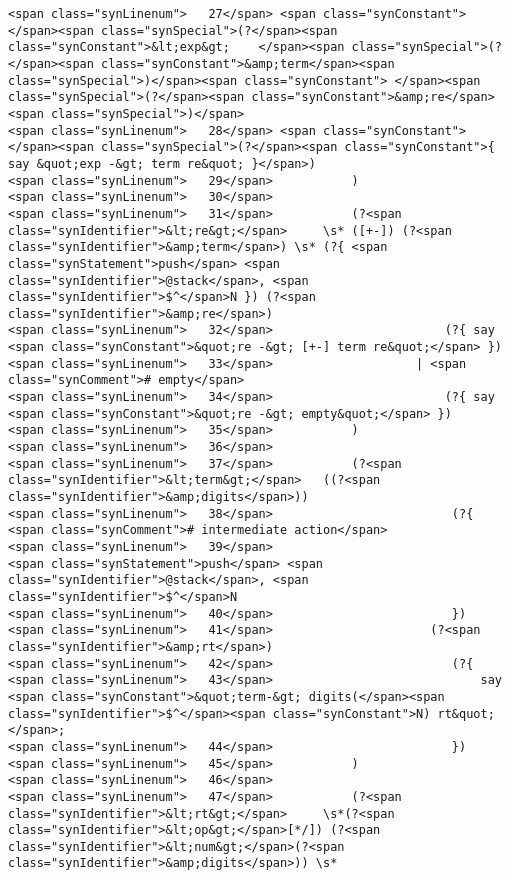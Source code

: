 \begin{verbatim}
<span class="synLinenum">   27</span> <span class="synConstant">          </span><span class="synSpecial">(?</span><span class="synConstant">&lt;exp&gt;    </span><span class="synSpecial">(?</span><span class="synConstant">&amp;term</span><span class="synSpecial">)</span><span class="synConstant"> </span><span class="synSpecial">(?</span><span class="synConstant">&amp;re</span><span class="synSpecial">)</span>
<span class="synLinenum">   28</span> <span class="synConstant">                       </span><span class="synSpecial">(?</span><span class="synConstant">{ say &quot;exp -&gt; term re&quot; }</span>)
<span class="synLinenum">   29</span>           )
<span class="synLinenum">   30</span> 
<span class="synLinenum">   31</span>           (?<span class="synIdentifier">&lt;re&gt;</span>     \s* ([+-]) (?<span class="synIdentifier">&amp;term</span>) \s* (?{ <span class="synStatement">push</span> <span class="synIdentifier">@stack</span>, <span class="synIdentifier">$^</span>N }) (?<span class="synIdentifier">&amp;re</span>)
<span class="synLinenum">   32</span>                        (?{ say <span class="synConstant">&quot;re -&gt; [+-] term re&quot;</span> })
<span class="synLinenum">   33</span>                    | <span class="synComment"># empty</span>
<span class="synLinenum">   34</span>                        (?{ say <span class="synConstant">&quot;re -&gt; empty&quot;</span> })
<span class="synLinenum">   35</span>           )
<span class="synLinenum">   36</span> 
<span class="synLinenum">   37</span>           (?<span class="synIdentifier">&lt;term&gt;</span>   ((?<span class="synIdentifier">&amp;digits</span>))
<span class="synLinenum">   38</span>                         (?{ <span class="synComment"># intermediate action</span>
<span class="synLinenum">   39</span>                             <span class="synStatement">push</span> <span class="synIdentifier">@stack</span>, <span class="synIdentifier">$^</span>N
<span class="synLinenum">   40</span>                         })
<span class="synLinenum">   41</span>                      (?<span class="synIdentifier">&amp;rt</span>)
<span class="synLinenum">   42</span>                         (?{
<span class="synLinenum">   43</span>                             say <span class="synConstant">&quot;term-&gt; digits(</span><span class="synIdentifier">$^</span><span class="synConstant">N) rt&quot;</span>;
<span class="synLinenum">   44</span>                         })
<span class="synLinenum">   45</span>           )
<span class="synLinenum">   46</span> 
<span class="synLinenum">   47</span>           (?<span class="synIdentifier">&lt;rt&gt;</span>     \s*(?<span class="synIdentifier">&lt;op&gt;</span>[*/]) (?<span class="synIdentifier">&lt;num&gt;</span>(?<span class="synIdentifier">&amp;digits</span>)) \s*

\end{verbatim}
